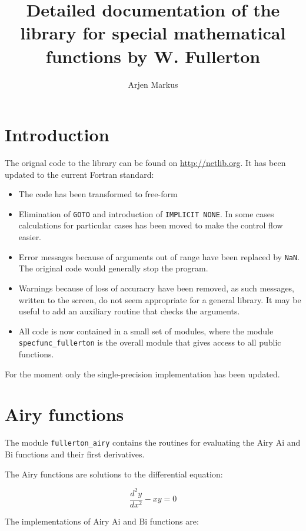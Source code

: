 \documentclass{article}
\begin{document}
\title{Detailed documentation of the library for special mathematical functions by W. Fullerton}
\author{Arjen Markus}
\maketitle

\section{Introduction}

The orignal code to the library can be found on \url{http://netlib.org}. It has been updated to the current
Fortran standard:

\begin{itemize}
\item
The code has been transformed to free-form
\item
Elimination of \verb+GOTO+ and introduction of \verb+IMPLICIT NONE+. In some cases calculations for
particular cases has been moved to make the control flow easier.
\item
Error messages because of arguments out of range have been replaced by \verb+NaN+. The original code would
generally stop the program.
\item
Warnings because of loss of accuracry have been removed, as such messages, written to the screen, do not seem
appropriate for a general library. It may be useful to add an auxiliary routine that checks the arguments.
\item
All code is now contained in a small set of modules, where the module \verb+specfunc_fullerton+ is the overall
module that gives access to all public functions.
\end{itemize}

For the moment only the single-precision implementation has been updated.

\section{Airy functions}
The module \verb+fullerton_airy+ contains the routines for evaluating the Airy Ai and Bi functions and their
first derivatives.

The Airy functions are solutions to the differential equation:

\begin{equation}
    \frac{d^2y}{dx^2} - xy = 0
\end{equation}

The implementations of Airy Ai and Bi functions are:
\end{document}

